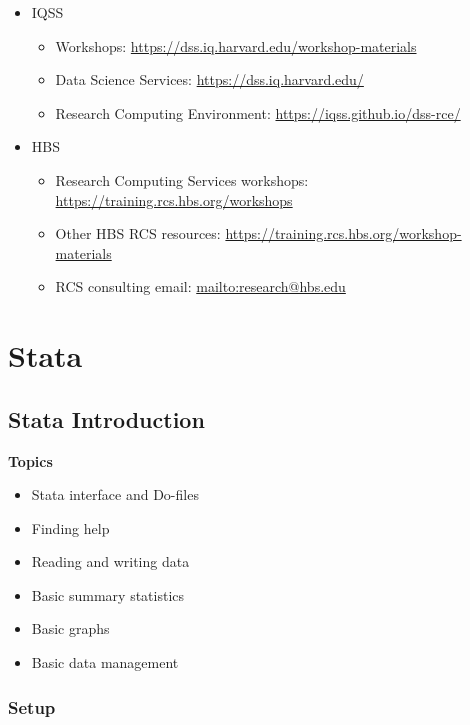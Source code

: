 \documentclass[]{book}
\providecommand{\tightlist}{%
  \setlength{\itemsep}{0pt}\setlength{\parskip}{0pt}}
\begin{document}
\begin{itemize}
\tightlist
\item
  IQSS

  \begin{itemize}
  \tightlist
  \item
    Workshops: \url{https://dss.iq.harvard.edu/workshop-materials}
  \item
    Data Science Services: \url{https://dss.iq.harvard.edu/}
  \item
    Research Computing Environment:
    \url{https://iqss.github.io/dss-rce/}
  \end{itemize}
\item
  HBS

  \begin{itemize}
  \tightlist
  \item
    Research Computing Services workshops:
    \url{https://training.rcs.hbs.org/workshops}
  \item
    Other HBS RCS resources:
    \url{https://training.rcs.hbs.org/workshop-materials}
  \item
    RCS consulting email: \url{mailto:research@hbs.edu}
  \end{itemize}
\end{itemize}

\part{Stata}\label{part-stata}

\chapter{Stata Introduction}\label{stata-introduction}

\textbf{Topics}

\begin{itemize}
\tightlist
\item
  Stata interface and Do-files
\item
  Finding help
\item
  Reading and writing data
\item
  Basic summary statistics
\item
  Basic graphs
\item
  Basic data management
\end{itemize}

\section{Setup}\label{setup-6}
\end{document}
